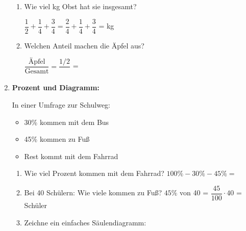 \begin{enumerate}[resume, label=\arabic*.]
    \begin{enumerate}[label=\alph*)]
        \item Wie viel kg Obst hat sie insgesamt?

        $\dfrac{1}{2} + \dfrac{1}{4} + \dfrac{3}{4} = \dfrac{2}{4} + \dfrac{1}{4} + \dfrac{3}{4}$ = \underline{\hspace{3cm}} kg

        \item Welchen Anteil machen die Äpfel aus?

        $\dfrac{\text{Äpfel}}{\text{Gesamt}} = \dfrac{1/2}{\phantom{3/2}}$ = \underline{\hspace{3cm}}
    \end{enumerate}

    \vspace{0.5cm}

    \item \textbf{Prozent und Diagramm:}

    In einer Umfrage zur Schulweg:
    \begin{itemize}
        \item 30\% kommen mit dem Bus
        \item 45\% kommen zu Fuß
        \item Rest kommt mit dem Fahrrad
    \end{itemize}

    \begin{enumerate}[label=\alph*)]
        \item Wie viel Prozent kommen mit dem Fahrrad? 
        $100\% - 30\% - 45\% = $ \underline{\hspace{3cm}}

        \item Bei 40 Schülern: Wie viele kommen zu Fuß? 
        $45\%$ von 40 = $\dfrac{45}{100} \cdot 40$ = \underline{\hspace{3cm}} Schüler

        \item Zeichne ein einfaches Säulendiagramm:

        \begin{center}
        \end{center}
    \end{enumerate}


\end{enumerate}
